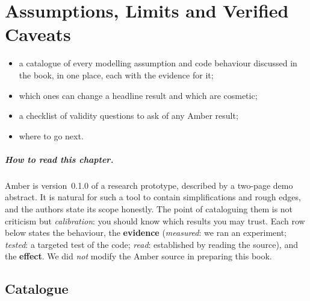 \chapter{Assumptions, Limits and Verified Caveats}
\label{ch:limits}

\begin{defbox}
\begin{itemize}
 \item a catalogue of every modelling assumption and code behaviour discussed in the book, in one place, each with the evidence for it;
 \item which ones can change a headline result and which are cosmetic;
 \item a checklist of validity questions to ask of any Amber result;
 \item where to go next.
\end{itemize}
\end{defbox}

\paragraph{How to read this chapter.} Amber is version~0.1.0 of a research prototype, described by a two-page demo abstract. It is natural for such a tool to contain simplifications and rough edges, and the authors state its scope honestly. The point of cataloguing them is not criticism but \emph{calibration}: you should know which results you may trust. Each row below states the behaviour, the \textbf{evidence} (\emph{measured}: we ran an experiment; \emph{tested}: a targeted test of the code; \emph{read}: established by reading the source), and the \textbf{effect}. We did \emph{not} modify the Amber source in preparing this book.

\section{Catalogue}

\newcommand{\sev}[1]{\textbf{#1}}
\setlength{\LTleft}{0pt}\setlength{\LTright}{0pt}
\renewcommand{\arraystretch}{1.12}


